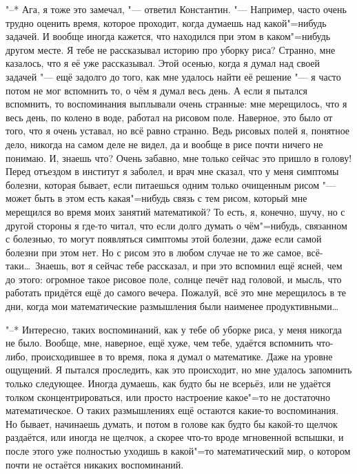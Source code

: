 "--* Ага, я тоже это замечал, "--- ответил Константин.
"--- Например, часто очень трудно оценить время, которое проходит, когда думаешь
над какой"=нибудь задачей.
И вообще иногда кажется, что находился при этом в каком"=нибудь другом месте.
Я тебе не рассказывал историю про уборку риса?
Странно, мне казалось, что я её уже рассказывал.
Этой осенью, когда я думал над своей задачей "--- ещё задолго до того, как мне
удалось найти её решение "--- я часто потом не мог вспомнить то, о чём я думал
весь день.
А если я пытался вспомнить, то воспоминания выплывали очень странные: мне
мерещилось, что я весь день, по колено в воде, работал на рисовом поле.
Наверное, это было от того, что я очень уставал, но всё равно странно.
Ведь рисовых полей я, понятное дело, никогда на самом деле не видел, да и вообще
в рисе почти ничего не понимаю.
И, знаешь что?
Очень забавно, мне только сейчас это пришло в голову!
Перед отъездом в институт я заболел, и врач мне сказал, что у меня симптомы
болезни, которая бывает, если питаешься одним только очищенным рисом "--- может
быть в этом есть какая"=нибудь связь с тем рисом, который мне мерещился во время
моих занятий математикой?
То есть, я, конечно, шучу, но с другой стороны я где-то читал, что если долго
думать о чём"=нибудь, связанном с болезнью, то могут появляться симптомы этой
болезни, даже если самой болезни при этом нет.
Но с рисом это в любом случае не то же самое, всё-таки\ldots\
Знаешь, вот я сейчас тебе рассказал, и при это вспомнил ещё ясней, чем до этого:
огромное такое рисовое поле, солнце печёт над головой, и мысль, что работать
придётся ещё до самого вечера.
Пожалуй, всё это мне мерещилось в те дни, когда мои математические размышления
были наименее продуктивными\ldots

"--* Интересно, таких воспоминаний, как у тебе об уборке риса, у меня никогда не
было.
Вообще, мне, наверное, ещё хуже, чем тебе, удаётся вспомнить что-либо,
происходившее в то время, пока я думал о математике.
Даже на уровне ощущений.
Я пытался проследить, как это происходит, но мне удалось запомнить только
следующее.
Иногда думаешь, как будто бы не всерьёз, или не удаётся толком
сконцентрироваться, или просто настроение какое"=то не достаточно
математическое.
О таких размышлениях ещё остаются какие-то воспоминания.
Но бывает, начинаешь думать, и потом в голове как будто бы какой-то щелчок
раздаётся, или иногда не щелчок, а скорее что-то вроде мгновенной вспышки, и
после этого уже полностью уходишь в какой"=то математический мир, о котором
почти не остаётся никаких воспоминаний.

